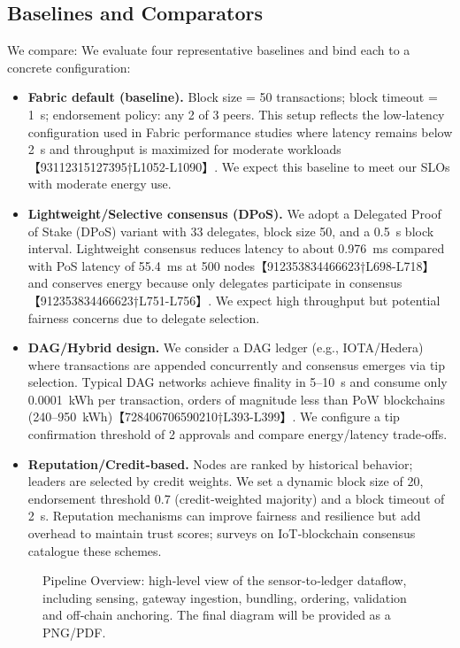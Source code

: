 \documentclass[12pt,onecolumn]{IEEEtran} %
\begin{document}
\subsection{Baselines and Comparators}
We compare:
We evaluate four representative baselines and bind each to a concrete configuration:
\begin{itemize}
  \item \textbf{Fabric default (baseline).}  Block size = 50 transactions; block timeout = 1~s; endorsement policy: any 2 of 3 peers.  This setup reflects the low‑latency configuration used in Fabric performance studies where latency remains below 2~s and throughput is maximized for moderate workloads【93112315127395†L1052-L1090】.  We expect this baseline to meet our SLOs with moderate energy use.
  \item \textbf{Lightweight/Selective consensus (DPoS).}  We adopt a Delegated Proof of Stake (DPoS) variant with 33 delegates, block size 50, and a 0.5~s block interval.  Lightweight consensus reduces latency to about 0.976~ms compared with PoS latency of 55.4~ms at 500 nodes【912353834466623†L698-L718】 and conserves energy because only delegates participate in consensus【912353834466623†L751-L756】.  We expect high throughput but potential fairness concerns due to delegate selection.
  \item \textbf{DAG/Hybrid design.}  We consider a DAG ledger (e.g., IOTA/Hedera) where transactions are appended concurrently and consensus emerges via tip selection.  Typical DAG networks achieve finality in 5–10~s and consume only 0.0001~kWh per transaction, orders of magnitude less than PoW blockchains (240–950~kWh)【728406706590210†L393-L399】.  We configure a tip confirmation threshold of 2 approvals and compare energy/latency trade‑offs.
  \item \textbf{Reputation/Credit‑based.}  Nodes are ranked by historical behavior; leaders are selected by credit weights.  We set a dynamic block size of 20, endorsement threshold 0.7 (credit‑weighted majority) and a block timeout of 2~s.  Reputation mechanisms can improve fairness and resilience but add overhead to maintain trust scores; surveys on IoT‑blockchain consensus catalogue these schemes\cite{morais2023surveyonintegration}.
\end{itemize}

\begin{figure}[!t]
  \centering
  \fbox{\rule{0pt}{1.5in}\rule{0.95\linewidth}{0pt}} %
  \caption{Pipeline Overview: high‑level view of the sensor‑to‑ledger dataflow, including sensing, gateway ingestion, bundling, ordering, validation and off‑chain anchoring. The final diagram will be provided as a PNG/PDF.}
  \label{fig:pipeline-overview}
\end{figure}
\end{document}
